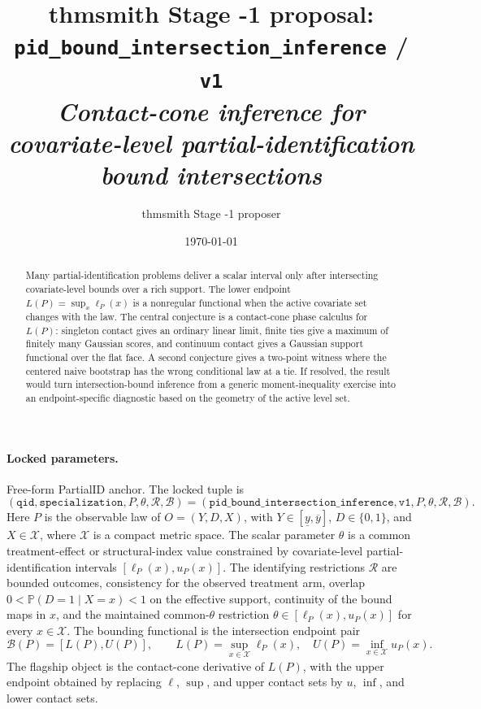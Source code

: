 \documentclass[11pt]{article}
\title{thmsmith Stage -1 proposal: \texttt{pid\_bound\_intersection\_inference} / \texttt{v1}%
  \\ \large\textit{Contact-cone inference for covariate-level partial-identification bound intersections}}
\author{thmsmith Stage -1 proposer}
\date{\today}
\renewcommand{\Pr}{\mathbb{P}}
\theoremstyle{definition}
\theoremstyle{plain}
\theoremstyle{remark}
\begin{document}
\maketitle


\paragraph{Locked parameters.}
Free-form PartialID anchor.  The locked tuple is
\[
(\texttt{qid},\texttt{specialization},P,\theta,\mathcal R,\mathcal B)
=
(\texttt{pid\_bound\_intersection\_inference},\texttt{v1},P,\theta,\mathcal R,\mathcal B).
\]
Here \(P\) is the observable law of \(O=(Y,D,X)\), with \(Y\in[\underline y,\overline y]\), \(D\in\{0,1\}\), and \(X\in\mathcal X\), where \(\mathcal X\) is a compact metric space.  The scalar parameter \(\theta\) is a common treatment-effect or structural-index value constrained by covariate-level partial-identification intervals \([\ell_P(x),u_P(x)]\).  The identifying restrictions \(\mathcal R\) are bounded outcomes, consistency for the observed treatment arm, overlap \(0<\Pr(D=1\mid X=x)<1\) on the effective support, continuity of the bound maps in \(x\), and the maintained common-\(\theta\) restriction \(\theta\in[\ell_P(x),u_P(x)]\) for every \(x\in\mathcal X\).  The bounding functional is the intersection endpoint pair
\[
  \mathcal B(P)=[L(P),U(P)],
  \qquad
  L(P)=\sup_{x\in\mathcal X}\ell_P(x),\quad
  U(P)=\inf_{x\in\mathcal X}u_P(x).
\]
The flagship object is the contact-cone derivative of \(L(P)\), with the upper endpoint obtained by replacing \(\ell\), \(\sup\), and upper contact sets by \(u\), \(\inf\), and lower contact sets.

\begin{abstract}
Many partial-identification problems deliver a scalar interval only after intersecting covariate-level bounds over a rich support.  The lower endpoint \(L(P)=\sup_x \ell_P(x)\) is a nonregular functional when the active covariate set changes with the law.  The central conjecture is a contact-cone phase calculus for \(L(P)\): singleton contact gives an ordinary linear limit, finite ties give a maximum of finitely many Gaussian scores, and continuum contact gives a Gaussian support functional over the flat face.  A second conjecture gives a two-point witness where the centered naive bootstrap has the wrong conditional law at a tie.  If resolved, the result would turn intersection-bound inference from a generic moment-inequality exercise into an endpoint-specific diagnostic based on the geometry of the active level set.
\end{abstract}
\end{document}
